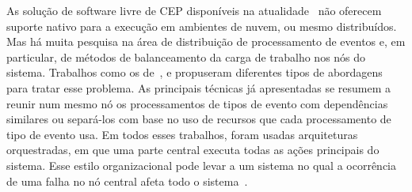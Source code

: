 As solução de software livre de CEP disponíveis na atualidade~\citep{Esper,DroolsFusion,WSO2CEP} %
não oferecem suporte nativo para a execução em ambientes de nuvem, ou mesmo distribuídos.
Mas há muita pesquisa na área de distribuição de processamento de eventos e, em particular, de métodos de balanceamento da carga de trabalho nos nós do sistema. Trabalhos como os de~\cite{Isoyama:2012:SCE:2335484.2335498}, \cite{6906776} e \cite{Balkesen:2013:RRI:2488222.2488257} propuseram diferentes tipos de abordagens para tratar esse problema. As principais técnicas já apresentadas
se resumem a reunir num mesmo nó os processamentos de tipos de evento com dependências similares ou separá-los com base no uso de recursos que cada processamento de tipo de evento usa. Em todos esses trabalhos, foram usadas  arquiteturas orquestradas, em que uma parte central executa todas as ações principais do sistema. Esse estilo organizacional pode levar a um sistema no qual a ocorrência de uma falha no nó central afeta todo o sistema~\citep{Newman:2015:BM:2904388}. 








